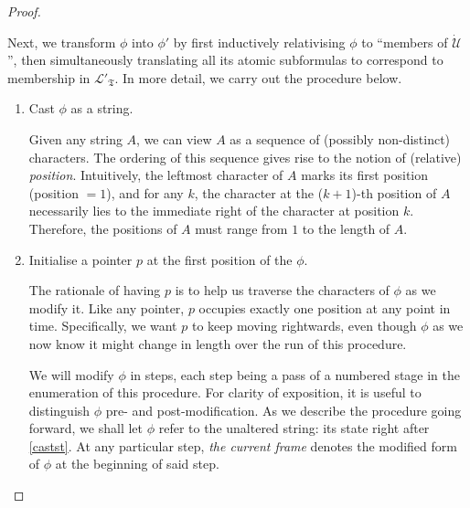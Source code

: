 \documentclass[12pt, twoside]{memoir}
\numberwithin{equation}{section}
\theoremstyle{definition}
\theoremstyle{remark}
\theoremstyle{definition}
\theoremstyle{definition}
\theoremstyle{definition}
\theoremstyle{remark}
\begin{document}
\begin{proof}
\begin{enumerate}[label=(\arabic*)]
    Next, we transform $\phi$ into $\phi'$ by first inductively relativising $\phi$ to ``members of $\dot{\mathcal{U}}$'', then simultaneously translating all its atomic subformulas to correspond to membership in $\mathcal{L}'_{\mathfrak{T}}$. In more detail, we carry out the procedure below.
    \begin{enumerate}[label=(\Alph*)]
        \item\label{castst} Cast $\phi$ as a string. 
        
        Given any string $A$, we can view $A$ as a sequence of (possibly non-distinct) characters. The ordering of this sequence gives rise to the notion of (relative) \emph{position}. Intuitively, the leftmost character of $A$ marks its first position (position $= 1$), and for any $k$, the character at the ($k+1$)-th position of $A$ necessarily lies to the immediate right of the character at position $k$. Therefore, the positions of $A$ must range from $1$ to the length of $A$.
        
        \item Initialise a pointer $p$ at the first position of the $\phi$. 

        The rationale of having $p$ is to help us traverse the characters of $\phi$ as we modify it. Like any pointer, $p$ occupies exactly one position at any point in time. Specifically, we want $p$ to keep moving rightwards, even though $\phi$ as we now know it might change in length over the run of this procedure.
        
        We will modify $\phi$ in steps, each step being a pass of a numbered stage in the enumeration of this procedure. For clarity of exposition, it is useful to distinguish $\phi$ pre- and post-modification. As we describe the procedure going forward, we shall let $\phi$ refer to the unaltered string: its state right after \ref{castst}. At any particular step, \emph{the current frame} denotes the modified form of $\phi$ at the beginning of said step. 
        

\end{enumerate}
\end{enumerate}
\end{proof}
\end{document}
